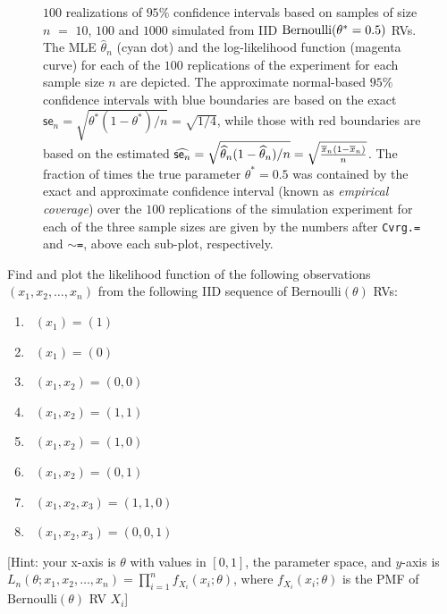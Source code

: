 \begin{figure}[htbp]
\caption{{\small $100$ realizations of $95\%$ confidence intervals based on samples of size $n$ $=$ $10$, $100$ and $1000$ simulated from IID $\mbox{{\rm Bernoulli}}(\theta^*=0.5)$ RVs.  %
The MLE $\widehat{\theta}_n$ (cyan dot) and the log-likelihood function (magenta curve) for each of the $100$ replications of the experiment for each sample size $n$ are depicted.  
The approximate normal-based $95\%$ confidence intervals with blue boundaries are based on the exact $\mathsf{se}_n=\sqrt{\theta^*(1-\theta^*)/n}=\sqrt{1/4}$, while those with red boundaries are based on the estimated $\widehat{\mathsf{se}_n}=\sqrt{\widehat{\theta}_n(1-\widehat{\theta}_n)/n} = \sqrt{\frac{\overline{x}_n(1-\overline{x}_n)}{n}}$.  
The fraction of times the true parameter $\theta^*=0.5$ was contained by the exact and approximate confidence interval (known as {\em empirical coverage}) over the $100$ replications of the simulation experiment for each of the three sample sizes are given by the numbers after {\tt Cvrg.=} and {\tt $\sim$=}, above each sub-plot, respectively.}\label{F:BernoulliMLEConsistency}}
\begin{center}
\end{center}
\end{figure}  

\clearpage

%
%

\begin{Exercise}[title={Likelihoods of tiny $\bernoulli$ trials},label={ExLklOfTinyBernoulliTrials}]
Find and plot the likelihood function of the following observations $(x_1,x_2,\ldots,x_n)$ from the following IID sequence of $\mathrm{Bernoulli}(\theta)$ RVs:
\begin{enumerate}
\item~$(x_1)=(1)$
\item~$(x_1)=(0)$
\item~$(x_1,x_2)=(0,0)$
\item~$(x_1,x_2)=(1,1)$
\item~$(x_1,x_2)=(1,0)$
\item~$(x_1,x_2)=(0,1)$
\item~$(x_1,x_2,x_3)=(1,1,0)$
\item~$(x_1,x_2,x_3)=(0,0,1)$
\end{enumerate}
[Hint: your x-axis is $\theta$ with values in $[0,1]$, the parameter space, and $y$-axis is $L_n(\theta; x_1,x_2,\ldots,x_n) = \prod_{i=1}^n f_{X_i}(x_i;\theta)$, where $f_{X_i}(x_i;\theta)$ is the PMF of $\mathrm{Bernoulli}(\theta)$ RV $X_i$]
\end{Exercise}


